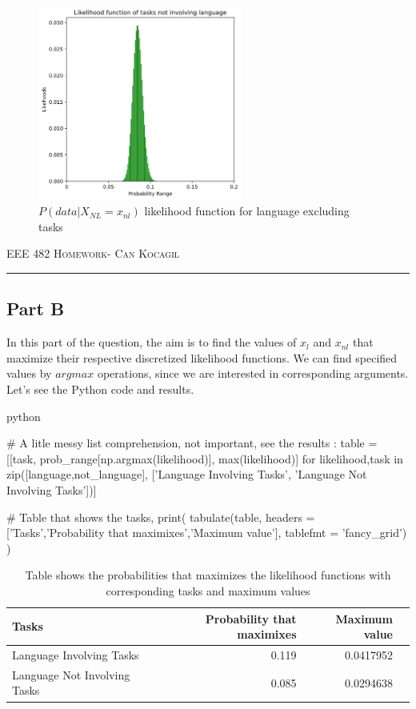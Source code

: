 \documentclass[12pt]{amsart}
\begin{document}
\begin{figure}[h]
\centering
\includegraphics[width = 0.6\textwidth]{images/2.png}
\caption{$P (data|X_{NL}= x_{nl})$  likelihood function for language excluding  tasks }
\end{figure}

\newpage
{\scshape EEE 482} \hfill {\scshape \large  Homework-\relax} \hfill {\scshape Can Kocagil}
\smallskip
\hrule

\subsection{Part B}
In this part of the question, the aim is to find the values of $x_l$ and  $x_{nl}$ that maximize their respective discretized likelihood functions. We can find specified values by $argmax$ operations, since we are interested in corresponding arguments. Let’s see the Python code and results.
\begin{mintedbox}{python}

# A litle messy list comprehension, not important, see the results :
table = [[task, prob_range[np.argmax(likelihood)], max(likelihood)] 
        for likelihood,task in zip([language,not_language],
        ['Language Involving Tasks', 'Language Not Involving Tasks'])]

# Table that shows the tasks, 
print(
tabulate(table,
headers = ['Tasks','Probability that maximixes','Maximum value'],
tablefmt = 'fancy_grid')
)

\end{mintedbox}


\begin{table}[ht]
    \centering
    \begin{tabular}{|l|r|r|r|}
        \hline Tasks & Probability that maximixes & Maximum value \\
        \hline Language Involving Tasks & 0.119 & 0.0417952 \\
        \hline Language Not Involving Tasks & 0.085 & 0.0294638 \\
        \hline
    \end{tabular}
    \vspace{3mm}\caption{Table shows the probabilities that maximizes the likelihood functions with corresponding tasks and maximum values }
\end{table}
\end{document}
